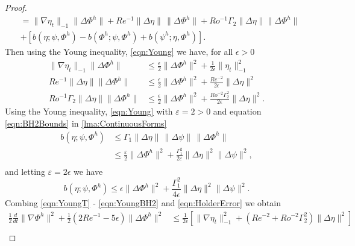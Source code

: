 \begin{proof}
\begin{equation}
\begin{split}
        &= \|\nabla \eta_t\|_{-1} \|\Delta \Phi^h\|
        + Re^{-1}\|\Delta \eta\|\, \|\Delta \Phi^h\|
        + Ro^{-1} \Gamma_2 \|\Delta \eta\| \|\Delta \Phi^h\| \\
      & + \left[ b(\eta;\psi,\Phi^h) - b(\Phi^h;\psi,\Phi^h)
        + b(\psi^h;\eta,\Phi^h)\right].
    \end{split}
    \label{eqn:HolderError}
  \end{equation}
  Then using the Young inequality, \eqref{eqn:Young} we have, for all $\epsilon>0$
  \begin{align}
    \|\nabla \eta_t\|_{-1} \|\Delta \Phi^h\|
      &\le \frac{\epsilon}{2} \|\Delta \Phi^h\|^2
      + \frac{1}{2 \epsilon} \|\eta_t\|_{-1}^2 \label{eqn:YoungT} \\
    Re^{-1} \|\Delta \eta\| \|\Delta \Phi^h\|
      &\le \frac{\epsilon}{2} \|\Delta \Phi^h\|^2
      + \frac{Re^{-2}}{2 \epsilon} \|\Delta \eta\|^2 \label{eqn:YoungLaplace} \\
    Ro^{-1} \Gamma_2 \|\Delta \eta\| \|\Delta \Phi^h\|
      &\le \frac{\epsilon}{2} \|\Delta \Phi^h\|^2
      + \frac{Ro^{-2} \Gamma_2^2}{2 \epsilon} \|\Delta \eta\|^2. \label{eqn:YoungBeta}
  \end{align}
  Using the Young inequality, \eqref{eqn:Young} with $\varepsilon = 2 > 0$ and
  equation \eqref{eqn:BH2Bounds} in \autoref{lma:ContinuousForms}
  \begin{align*}
    b(\eta;\psi,\Phi^h) &\le \Gamma_1 \|\Delta \eta\|\,\|\Delta \psi\|\, \|\Delta \Phi^h\| \\
    &\le \frac{\varepsilon}{2} \|\Delta \Phi^h\|^2
      + \frac{\Gamma_1^2}{2 \varepsilon} \|\Delta \eta\|^2 \|\Delta \psi\|^2, \\
  \end{align*}
  and letting $\varepsilon = 2 \epsilon$ we have
  \begin{equation}
    b(\eta; \psi, \Phi^h) \le \epsilon \|\Delta \Phi^h\|^2
      + \frac{\Gamma_1^2}{4 \epsilon} \|\Delta \eta\|^2 \|\Delta \psi\|^2.
      \label{eqn:YoungBH2}
  \end{equation}
  Combing \eqref{eqn:YoungT} - \eqref{eqn:YoungBH2} and \eqref{eqn:HolderError}
  we obtain
  \begin{equation}
    \begin{split}
    \frac{1}{2} \frac{d}{dt} \|\nabla \Phi^h\|^2 + \frac{1}{2}\left(2Re^{-1} -
      5 \epsilon \right)\|\Delta \Phi^h\|^2
      &\le \frac{1}{2 \epsilon}\left[\|\nabla \eta_t\|_{-1}^2
      + \left( Re^{-2} + Ro^{-2} \Gamma_2^2 \right) \|\Delta \eta\|^2\right] \\

\end{split}
\end{equation}
\end{proof}
